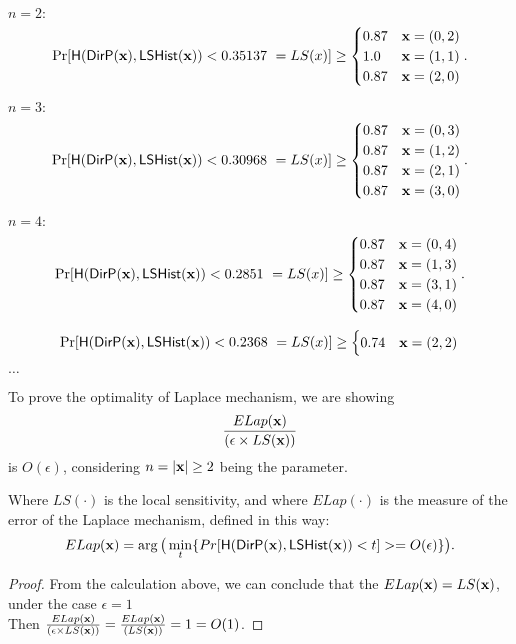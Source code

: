 \documentclass{article}
\begin{document}
{\small

\noindent $n = 2:$
\[
\Pr[\hlg(\bysinfer{\dataobs}, \ilapmech(\dataobs)) < 0.35137 ~ = LS(x)]
\geq \begin{cases}
	0.87	& \dataobs = (0, 2)\\
%
	1.0		& \dataobs = (1, 1)\\
%
	0.87	& \dataobs = (2, 0)\\
\end{cases}.
\]


\noindent $n = 3:$
\[
\Pr[\hlg(\bysinfer{\dataobs}, \ilapmech(\dataobs)) < 0.30968 ~ = LS(x)]
\geq \begin{cases}
 	0.87
	& \dataobs = (0, 3)\\
%
 	0.87
	& \dataobs = (1, 2)\\
%
 	0.87
	& \dataobs = (2, 1)\\
%
	0.87
	& \dataobs = (3, 0)
\end{cases}.
\]

\noindent $n = 4:$
\[
\Pr[\hlg(\bysinfer{\dataobs}, \ilapmech(\dataobs)) < 0.2851 ~ = LS(x)]
\geq 
\begin{cases}
 	0.87
	& \dataobs = (0, 4)\\
%
 	0.87
	& \dataobs = (1, 3)\\
%
	0.87
	& \dataobs = (3, 1)\\
%
	0.87
	& \dataobs = (4, 0)
\end{cases}.
\]

\[
\Pr[\mathsf{H}(\mathsf{DirP}(\textbf{x}), \mathsf{LSHist}(\textbf{x})) < 0.2368 ~ = LS(x)]
\geq
\begin{cases}
0.74 & \textbf{x} = (2, 2)
\end{cases}
\]




$\dots$

\begin{thm}
To prove the optimality of Laplace mechanism, we are showing 
\[
\frac{ELap(\textbf{x})}{(\epsilon \times LS(\textbf{x}))}
\]
is {\color{red}$O(\epsilon)$}, considering $n=|\textbf{x}| \geq 2$ being the parameter.

Where $LS(\cdot)$ is the local sensitivity, and where $ELap(\cdot)$ is the measure of the error of the Laplace mechanism, defined in this way:
 {\color{red}
 \[
ELap(\textbf{x}) = \arg\big( \min\limits_{t}\{Pr[\mathsf{H}(\mathsf{DirP}(\textbf{x}), \mathsf{LSHist}(\textbf{x}))< t] >= O(\epsilon)\} \big).
\]}
\end{thm}

\begin{proof}
From the calculation above, we can conclude that the $ELap(\textbf{x}) = LS(\textbf{x})$, under the case $\epsilon = 1$\\
Then $\frac{ELap(\textbf{x})}{(\epsilon \times LS(\textbf{x}))} = \frac{ELap(\textbf{x})}{(LS(\textbf{x}))} = 1 = O(1)$.


\end{proof}}
\end{document}
